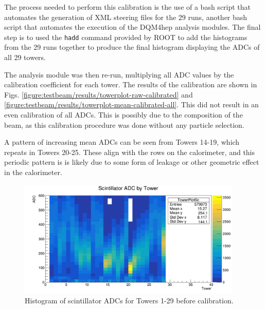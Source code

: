 The process needed to perform this calibration is the use of a bash script that automates the generation of XML steering files for the 29 runs, another bash script that automates the execution of the DQM4hep analysis modules. The final step is to used the \texttt{hadd} command provided by ROOT to add the histograms from the 29 runs together to produce the final histogram displaying the ADCs of all 29 towers.

The analysis module was then re-run, multiplying all ADC values by the calibration coefficient for each tower. The results of the calibration are shown in Figs. \ref{figure:testbeam/results/towerplot-raw-calibrated} and \ref{figure:testbeam/results/towerplot-mean-calibrated-all}. This did not result in an even calibration of all \acrshort{ADC}s. This is possibly due to the composition of the beam, as this calibration procedure was done without any particle selection.

A pattern of increasing mean ADCs can be seen from Towers 14-19, which repeats in Towers 20-25. These align with the rows on the calorimeter, and this periodic pattern is is likely due to some form of leakage or other geometric effect in the calorimeter. 

\begin{figure}[hp]
	\centering
	\includegraphics[width=0.95\textwidth]{../Pictures/IDEA/Calibration/towerplot-scintillator-uncalibrated.png}
	\caption{Histogram of scintillator \acrshort{ADC}s for Towers 1-29 before calibration.}
	\label{figure:testbeam/results/towerplot-raw-uncalibrated}
\end{figure}

